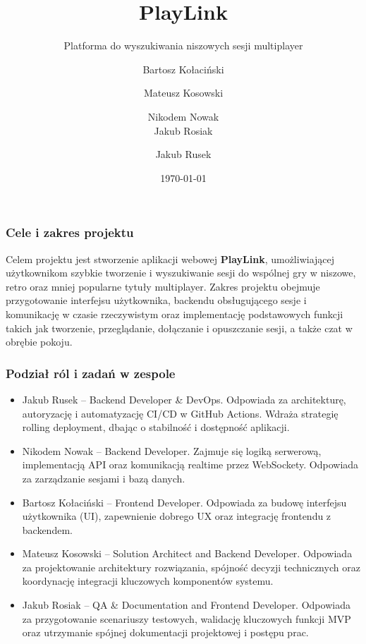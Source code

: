 \documentclass[10pt]{beamer}
\title{PlayLink}
\subtitle{Platforma do wyszukiwania niszowych sesji multiplayer}
\author[Kołaciński et al.]{
  \small Bartosz Kołaciński \and Mateusz Kosowski \and Nikodem Nowak \\
  \small Jakub Rosiak \and Jakub Rusek
}
\institute{Politechnika Łódzka \\ Wydział FTIMS}
\date{\today}
\begin{document}
\maketitle

\begin{frame}
	\frametitle{Cele i zakres projektu}

	Celem projektu jest stworzenie aplikacji webowej \textbf{PlayLink}, umożliwiającej użytkownikom szybkie tworzenie i wyszukiwanie sesji do wspólnej gry w niszowe, retro oraz mniej popularne tytuły multiplayer. Zakres projektu obejmuje przygotowanie interfejsu użytkownika, backendu obsługującego sesje i komunikację w czasie rzeczywistym oraz implementację podstawowych funkcji takich jak tworzenie, przeglądanie, dołączanie i opuszczanie sesji, a także czat w obrębie pokoju.
\end{frame}

\begin{frame}[shrink=10]
	\frametitle{Podział ról i zadań w zespole}

	\begin{itemize}
		\item Jakub Rusek – Backend Developer \& DevOps. Odpowiada za architekturę, autoryzację i automatyzację CI/CD w GitHub Actions. Wdraża strategię rolling deployment, dbając o stabilność i dostępność aplikacji.
		\item Nikodem Nowak – Backend Developer. Zajmuje się logiką serwerową, implementacją API oraz komunikacją realtime przez WebSockety. Odpowiada za zarządzanie sesjami i bazą danych.
		\item Bartosz Kołaciński – Frontend Developer. Odpowiada za budowę interfejsu użytkownika (UI), zapewnienie dobrego UX oraz integrację frontendu z backendem.
		\item Mateusz Kosowski – Solution Architect and Backend Developer. Odpowiada za projektowanie architektury rozwiązania, spójność decyzji technicznych oraz koordynację integracji kluczowych komponentów systemu.
		\item Jakub Rosiak – QA \& Documentation and Frontend Developer. Odpowiada za przygotowanie scenariuszy testowych, walidację kluczowych funkcji MVP oraz utrzymanie spójnej dokumentacji projektowej i postępu prac.
	\end{itemize}
\end{frame}

\end{document}
